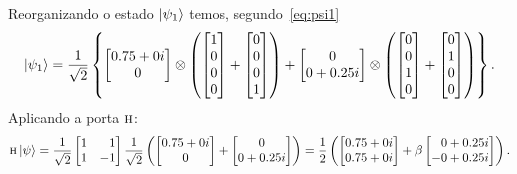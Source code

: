 Reorganizando o estado $\ket{\psi_1}$ temos, segundo~\eqref{eq:psi1}
\begin{equation}
  \ket{\psi_1} = \frac{1}{\sqrt{2}} \left\{ \begin{bmatrix} {0.75+0i} \\ 0 \end{bmatrix} \otimes
    \left(
      \begin{bmatrix} 1 \\ 0 \\ 0 \\ 0 \end{bmatrix} +
      \begin{bmatrix} 0 \\ 0 \\ 0 \\ 1 \end{bmatrix}
    \right) +
    \begin{bmatrix} 0 \\ {0+0.25i} \end{bmatrix} \otimes
    \left(
      \begin{bmatrix} 0 \\ 0 \\ 1 \\ 0 \end{bmatrix} +
      \begin{bmatrix} 0 \\ 1 \\ 0 \\ 0 \end{bmatrix}
    \right) \right\}.
\end{equation}
Aplicando a porta \(\operatorname{\textsc{h}}\):
\begin{equation}
  \HAD \ket{\psi} = \frac{1}{\sqrt{2}}
  \begin{bmatrix*}[r] 1 & 1 \\ 1 & -1 \end{bmatrix*}
  \frac{1}{\sqrt{2}}\left(
    \begin{bmatrix} {0.75+0i} \\ 0 \end{bmatrix} +
    \begin{bmatrix} 0 \\ {0+0.25i} \end{bmatrix} \right) =
  \frac{1}{2} \left( \begin{bmatrix} {0.75+0i} \\ {0.75+0i} \end{bmatrix} +
    \beta \begin{bmatrix*}[r] {0+0.25i} \\ -{0+0.25i} \end{bmatrix*} \right).
\end{equation}

